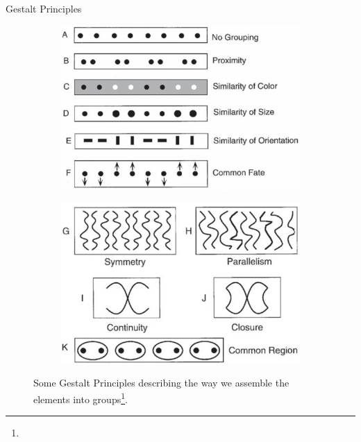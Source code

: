 \documentclass[10pt,xcolor=svgnames]{beamer} %
\begin{document}
\begin{frame}{Gestalt Principles}
    \begin{figure}
        \centering
        \begin{subfigure}{0.47\textwidth}
            \centering
            \includegraphics[width=\textwidth]{pictures/perceptualOrganization_4.png}
            \label{figure:Gestalt1}
        \end{subfigure}
        \hfill
        \begin{subfigure}{0.47\textwidth}
            \centering
            \includegraphics[width=\textwidth]{pictures/perceptualOrganization_5.png}
            \label{figure:Gestalt2}
        \end{subfigure}
        \hfill
    \label{fig:GestaltPrincips}
    \caption{Some Gestalt Principles describing the way we assemble the elements into groups\footnote{}.}
    \end{figure}
\end{frame}
\end{document}
